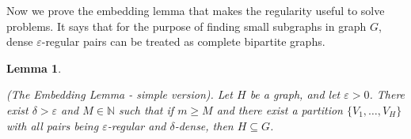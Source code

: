 \documentclass[12pt,twoside,a4paper,bibliography=totocnumbered]{book}
\numberwithin{equation}{section}
\newtheorem{lemma}     	[theorem] {Lemma}
\newtheorem{definition}	[theorem] {Definition}
\theoremstyle{remark}
\begin{document}
Now we prove the embedding lemma that makes the regularity useful to solve problems. It says that for the purpose of finding small subgraphs in graph $G$, dense $\varepsilon$-regular pairs can be treated as complete bipartite graphs.


\begin{lemma}\label{lemma:embeddinglemma}


(The Embedding Lemma - simple version). Let $H$ be a graph, and let $\varepsilon >0$. There exist $\delta >\varepsilon$ and $M \in \mathbb{N}$ such that if $m \geq M$ and there exist a partition $\{V_1, \ldots, V_H\}$ with all pairs being $\varepsilon$-regular and $\delta$-dense, then $H \subseteq G$. 
\end{lemma} 
\end{document}
